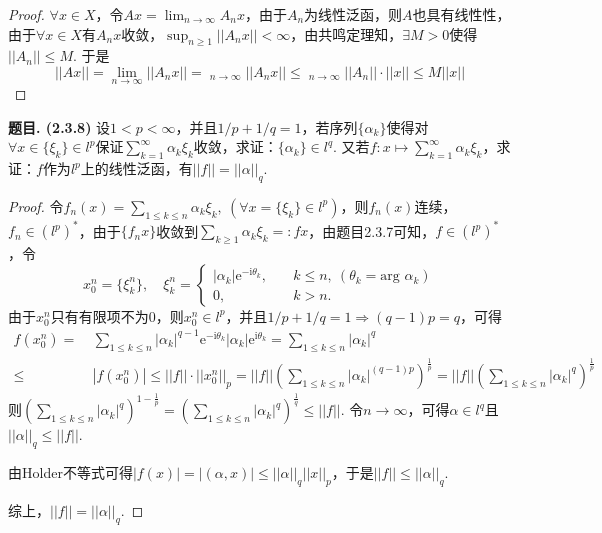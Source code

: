 \documentclass[12pt, a4paper, oneside]{ctexart}
\newcounter{problem}  %
\newenvironment{problem}[1][]{\stepcounter{problem}\par\noindent\textbf{题目\arabic{problem}. #1}}{\smallskip\par}
\DeclareMathOperator*\lowlim{\underline{lim}} %
\let\leq=\leqslant %
\let\geq=\geqslant %
\def\e{\mathrm{e}}          %
\def\i{\mathrm{i}}          %
\begin{document}
\vspace*{-1cm}
\begin{proof}
    $\forall x \in X$，令$Ax = \lim_{n\to\infty}A_nx$，由于$A_n$为线性泛函，则$A$也具有线性性，由于$\forall x\in X$有$A_nx$收敛，$\sup_{n\geq 1}||A_nx|| < \infty$，由共鸣定理知，$\exists M>0$使得$||A_n||\leq M$. 于是
    \begin{equation*}
        ||Ax|| = \lim_{n\to\infty}||A_nx|| = \lowlim_{n\to\infty}||A_nx||\leq \lowlim_{n\to\infty}||A_n||\cdot ||x||\leq M||x||
    \end{equation*}
\end{proof}
\begin{problem}[(2.3.8)]
    设$1 < p<\infty$，并且$1/p+1/q=1$，若序列$\{\alpha_k\}$使得对$\forall x\in \{\xi_k\} \in l^p$保证$\sum_{k=1}^\infty \alpha_k\xi_k$收敛，求证：$\{\alpha_k\}\in l^q$. 又若$f:x\mapsto \sum_{k=1}^\infty \alpha_k\xi_k$，求证：$f$作为$l^p$上的线性泛函，有$||f|| = ||\alpha||_q$.
\end{problem}
\clearpage
\begin{proof}
    令$f_n(x) = \sum_{1\leq k\leq n}\alpha_k\xi_k,\ (\forall x=\{\xi_k\}\in l^p)$，则$f_n(x)$连续，$f_n\in (l^p)^*$，由于$\{f_nx\}$收敛到$\sum_{k\geq 1}\alpha_k\xi_k =: fx$，由题目2.3.7可知，$f\in(l^p)^*$，令
    \begin{equation*}
        x_0^n = \{\xi_k^n\},\quad \xi_k^n=\begin{cases}
            |\alpha_k|\e^{-\i\theta_k},&\quad k\leq n,\ (\theta_k = \text{arg }\alpha_k)\\
            0,&\quad k > n.
        \end{cases}
    \end{equation*}
    由于$x_0^n$只有有限项不为$0$，则$x_0^n\in l^p$，并且$1/p+1/q=1\Rightarrow (q-1)p = q$，可得
    \begin{align*}
        f(x_0^n) =&\ \sum_{1\leq k\leq n}|\alpha_k|^{q-1}\e^{-\i\theta_k}|\alpha_k|\e^{\i\theta_k} = \sum_{1\leq k\leq n}|\alpha_k|^q\\
        \leq&\ |f(x_0^n)|\leq ||f||\cdot ||x_0^n||_p = ||f||\left(\sum_{1\leq k\leq n}|\alpha_k|^{(q-1)p}\right)^{\frac{1}{p}} = ||f||\left(\sum_{1\leq k\leq n}|\alpha_k|^{q}\right)^{\frac{1}{p}}
    \end{align*}
    则$\left(\sum_{1\leq k\leq n}|\alpha_k|^q\right)^{1-\frac{1}{p}} = \left(\sum_{1\leq k\leq n}|\alpha_k|^q\right)^{\frac{1}{q}}\leq ||f||$. 令$n\to\infty$，可得$\alpha\in l^q$且$||\alpha||_q\leq ||f||$.

    由Holder不等式可得$|f(x)| = |(\alpha, x)| \leq ||\alpha||_{q}||x||_p$，于是$||f||\leq ||\alpha||_q$.

    综上，$||f|| = ||\alpha||_q$.
\end{proof}
\end{document}
